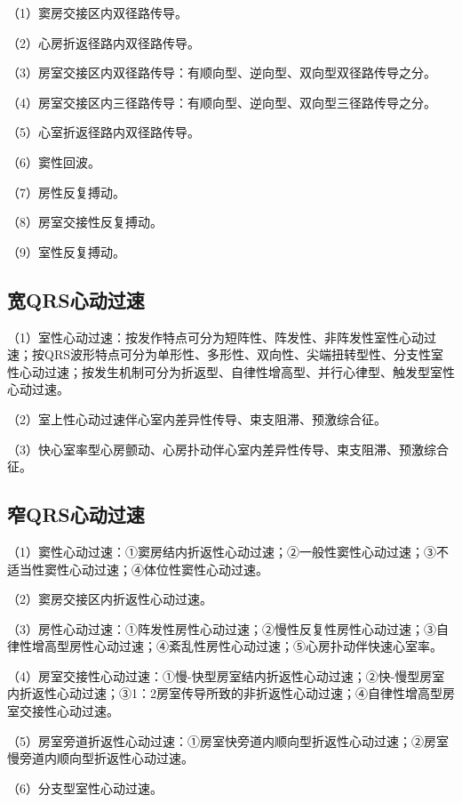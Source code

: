 （1）窦房交接区内双径路传导。

（2）心房折返径路内双径路传导。

（3）房室交接区内双径路传导：有顺向型、逆向型、双向型双径路传导之分。

（4）房室交接区内三径路传导：有顺向型、逆向型、双向型三径路传导之分。

（5）心室折返径路内双径路传导。

（6）窦性回波。

（7）房性反复搏动。

（8）房室交接性反复搏动。

（9）室性反复搏动。

\protect\hypertarget{text00057.htmlux5cux23subid697}{}{}

\subsection{宽QRS心动过速}

（1）室性心动过速：按发作特点可分为短阵性、阵发性、非阵发性室性心动过速；按QRS波形特点可分为单形性、多形性、双向性、尖端扭转型性、分支性室性心动过速；按发生机制可分为折返型、自律性增高型、并行心律型、触发型室性心动过速。

（2）室上性心动过速伴心室内差异性传导、束支阻滞、预激综合征。

（3）快心室率型心房颤动、心房扑动伴心室内差异性传导、束支阻滞、预激综合征。

\protect\hypertarget{text00057.htmlux5cux23subid698}{}{}

\subsection{窄QRS心动过速}

（1）窦性心动过速：①窦房结内折返性心动过速；②一般性窦性心动过速；③不适当性窦性心动过速；④体位性窦性心动过速。

（2）窦房交接区内折返性心动过速。

（3）房性心动过速：①阵发性房性心动过速；②慢性反复性房性心动过速；③自律性增高型房性心动过速；④紊乱性房性心动过速；⑤心房扑动伴快速心室率。

（4）房室交接性心动过速：①慢-快型房室结内折返性心动过速；②快-慢型房室内折返性心动过速；③1：2房室传导所致的非折返性心动过速；④自律性增高型房室交接性心动过速。

（5）房室旁道折返性心动过速：①房室快旁道内顺向型折返性心动过速；②房室慢旁道内顺向型折返性心动过速。

（6）分支型室性心动过速。

